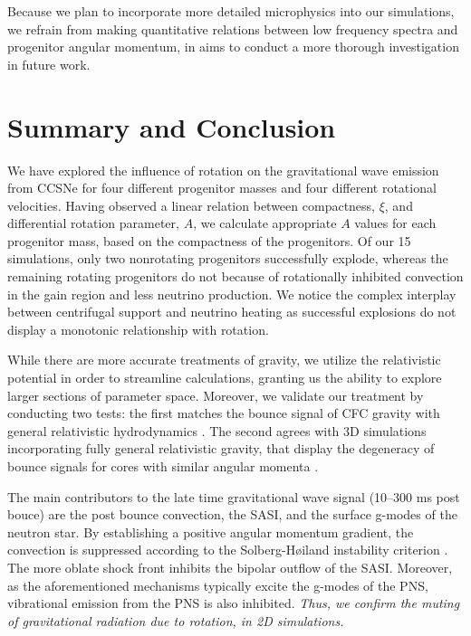 \documentclass[twocolumn,times]{aastex62}  %
\begin{document}
Because we plan to incorporate more detailed microphysics into our simulations, we refrain from making quantitative relations between low frequency spectra and progenitor angular momentum, in aims to conduct a more thorough investigation in future work.



\section{Summary and Conclusion}
\label{sec:summary}

We have explored the influence of rotation on the gravitational wave emission from CCSNe for four different progenitor masses and four different rotational velocities.  Having observed a linear relation between compactness, $\xi$, and differential rotation parameter, $A$, we calculate appropriate $A$ values for each progenitor mass, based on the compactness of the \citet{Suk:2016} progenitors.  Of our 15 simulations, only two nonrotating progenitors successfully explode, whereas the remaining rotating progenitors do not because of rotationally inhibited convection in the gain region and less neutrino production.  We notice the complex interplay between centrifugal support and neutrino heating as successful explosions do not display a monotonic relationship with rotation.

While there are more accurate treatments of gravity, we utilize the relativistic potential in order to streamline calculations, granting us the ability to explore larger sections of parameter space. Moreover, we validate our treatment by conducting two tests: the first matches the bounce signal of CFC gravity with general relativistic hydrodynamics \citep{richers:2017}.  The second agrees with 3D simulations incorporating fully general relativistic gravity, that display the degeneracy of bounce signals for cores with similar angular momenta \citep{ott:2012}.  

The main contributors to the late time gravitational wave signal (10--300 ms post bouce) are the post bounce convection, the SASI, and the surface g-modes of the neutron star.  By establishing a positive angular momentum gradient, the convection is suppressed according to the Solberg-H{\o}iland instability criterion \citep{endal:1978,fryer:2000}.  The more oblate shock front inhibits the bipolar outflow of the SASI.  Moreover, as the aforementioned mechanisms typically excite the g-modes of the PNS, vibrational emission from the PNS is also inhibited.  \textit{Thus, we confirm the muting of gravitational radiation due to rotation, in 2D simulations.}  
\end{document}
